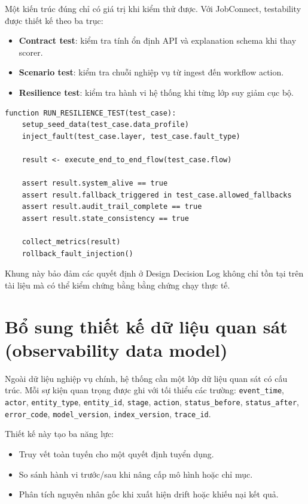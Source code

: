 Một kiến trúc đúng chỉ có giá trị khi kiểm thử được. Với JobConnect, testability được thiết kế theo ba trục:

\begin{itemize}
  \item \textbf{Contract test}: kiểm tra tính ổn định API và explanation schema khi thay scorer.
  \item \textbf{Scenario test}: kiểm tra chuỗi nghiệp vụ từ ingest đến workflow action.
  \item \textbf{Resilience test}: kiểm tra hành vi hệ thống khi từng lớp suy giảm cục bộ.
\end{itemize}

\begin{lstlisting}[language={},caption={Pseudo-code kiểm thử resilience theo lớp},label={lst:resilience-test-harness}]
function RUN_RESILIENCE_TEST(test_case):
    setup_seed_data(test_case.data_profile)
    inject_fault(test_case.layer, test_case.fault_type)

    result <- execute_end_to_end_flow(test_case.flow)

    assert result.system_alive == true
    assert result.fallback_triggered in test_case.allowed_fallbacks
    assert result.audit_trail_complete == true
    assert result.state_consistency == true

    collect_metrics(result)
    rollback_fault_injection()
\end{lstlisting}

Khung này bảo đảm các quyết định ở Design Decision Log không chỉ tồn tại trên tài liệu mà có thể kiểm chứng bằng bằng chứng chạy thực tế.

\section{Bổ sung thiết kế dữ liệu quan sát (observability data model)}

Ngoài dữ liệu nghiệp vụ chính, hệ thống cần một lớp dữ liệu quan sát có cấu trúc. Mỗi sự kiện quan trọng được ghi với tối thiểu các trường: \texttt{event\_time}, \texttt{actor}, \texttt{entity\_type}, \texttt{entity\_id}, \texttt{stage}, \texttt{action}, \texttt{status\_before}, \texttt{status\_after}, \texttt{error\_code}, \texttt{model\_version}, \texttt{index\_version}, \texttt{trace\_id}.

Thiết kế này tạo ba năng lực:

\begin{itemize}
  \item Truy vết toàn tuyến cho một quyết định tuyển dụng.
  \item So sánh hành vi trước/sau khi nâng cấp mô hình hoặc chỉ mục.
  \item Phân tích nguyên nhân gốc khi xuất hiện drift hoặc khiếu nại kết quả.
\end{itemize}

